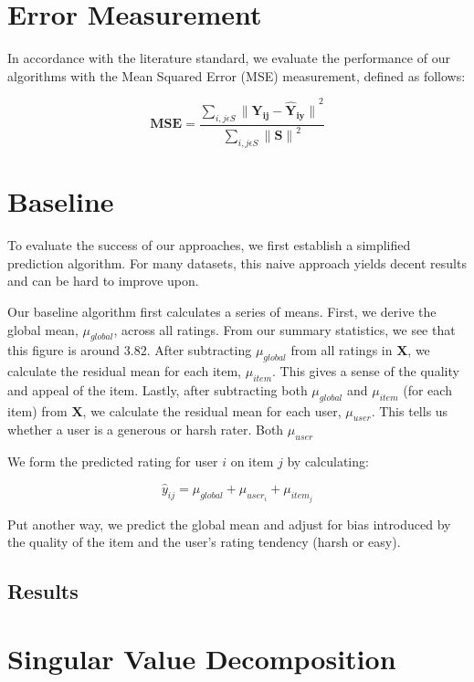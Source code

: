 \documentclass[12pt]{article}
\begin{document}
\section{Error Measurement}
In accordance with the literature standard, we evaluate the performance of our algorithms with the Mean Squared Error (MSE) measurement, defined as follows: 

$$ \mathbf{MSE} = \frac{\sum\limits_{i,j \epsilon S} {\mathbf{\|Y_{ij} - \hat{Y}_{iy}\|}}^2}{\sum\limits_{i,j \epsilon S}{\mathbf{\|S\|}}^2} $$

\section{Baseline}
To evaluate the success of our approaches, we first establish a simplified prediction algorithm. For many datasets, this naive approach yields decent results and can be hard to improve upon.

Our baseline algorithm first calculates a series of means. First, we derive the global mean, $\mu_{global}$, across all ratings. From our summary statistics, we see that this figure is around $3.82$. After subtracting $\mu_{global}$ from all ratings in $\mathbf{X}$, we calculate the residual mean for each item, $\mu_{item}$. This gives a sense of the quality and appeal of the item. Lastly, after subtracting both $\mu_{global}$ and $\mu_{item}$ (for each item) from $\mathbf{X}$, we calculate the residual mean for each user, $\mu_{user}$. This tells us whether a user is a generous or harsh rater. Both $\mu_{user}$

We form the predicted rating for user $i$ on item $j$ by calculating:

$$\hat y_{ij} = \mu_{global} + \mu_{user_i} + \mu_{item_j}$$

Put another way, we predict the global mean and adjust for bias introduced by the quality of the item and the user's rating tendency (harsh or easy).

\subsection{Results}

\section{Singular Value Decomposition}
\end{document}
